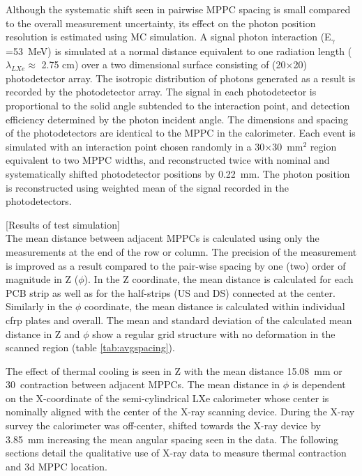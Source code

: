 Although the systematic shift seen in pairwise MPPC spacing is small compared
to the overall measurement uncertainty, its effect on the photon position
resolution is estimated using MC simulation.  
A signal photon
interaction (E$_\gamma$=53~MeV) 
is simulated at a normal distance equivalent to 
one radiation length ($\lambda_{LXe}\approx$ 2.75 cm) 
over a two dimensional surface 
consisting of (20$\times$20) photodetector array. 
The isotropic distribution of photons generated as a result
is recorded by the photodetector array. The signal in each 
photodetector is proportional to the solid angle subtended to the
interaction point, and detection efficiency determined by the
photon incident angle.
The dimensions and spacing of the photodetectors are identical to
the MPPC in the calorimeter. Each event is simulated with
an interaction point chosen randomly in a 30$\times$30~mm$^2$
region equivalent to two MPPC widths, 
and reconstructed twice with nominal and systematically
shifted photodetector positions by 0.22~mm. 
The photon position is reconstructed using weighted mean 
of the signal recorded in the photodetectors.

[Results of test simulation]\\


The mean distance between adjacent MPPCs is calculated
using only the measurements at the 
end of the row or column.
The precision of the measurement is improved as a result compared to the
pair-wise spacing by  one (two) order of magnitude in Z ($\phi$).  In
the Z coordinate, the mean distance is calculated for each PCB strip
as well as for the half-strips (US and DS) connected at the center.
Similarly in the $\phi$ coordinate, the mean distance is calculated
within individual cfrp plates and overall.  The mean and standard
deviation of the calculated mean distance in Z and $\phi$  show a
regular grid structure with no deformation in the scanned region
(table \ref{tab:avgspacing}).

The effect of thermal cooling is seen in Z with the
mean distance 15.08~mm  or 30~\micron contraction between adjacent
MPPCs. The mean distance in $\phi$ is dependent on the X-coordinate of
the semi-cylindrical LXe calorimeter whose center is nominally aligned
with the center of the X-ray scanning device.  During the X-ray survey
the calorimeter was off-center, shifted towards the X-ray device by
3.85~mm increasing the mean angular spacing seen in the data.  The
following sections detail the qualitative use of X-ray data to measure
thermal contraction and 3d MPPC location.

